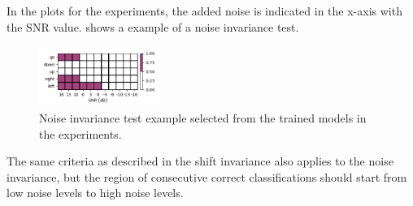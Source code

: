 \FloatBarrier
\noindent
In the plots for the experiments, the added noise is indicated in the x-axis with the SNR value.
 shows a example of a noise invariance test.
\begin{figure}[!ht]
  \centering
    \includegraphics[width=0.35\textwidth]{./5_exp/figs/exp_fs_cepstral_tb_noise_conv-jim_mfcc12_norm0.png}
  \caption{Noise invariance test example selected from the trained models in the experiments.}
  \label{fig:exp_details_tb_noise}
\end{figure}
\FloatBarrier
\noindent
The same criteria as described in the shift invariance also applies to the noise invariance, but the region of consecutive correct classifications should start from low noise levels to high noise levels.